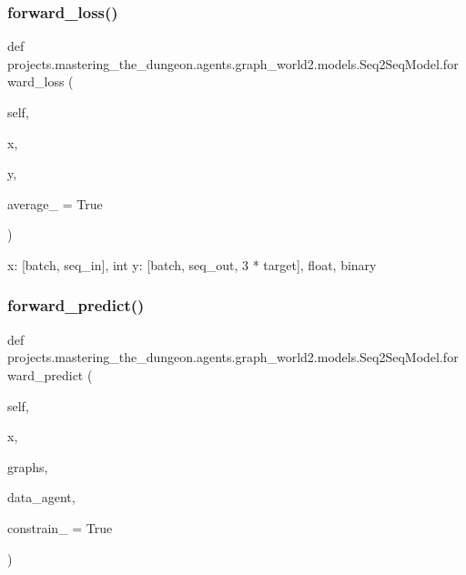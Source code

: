 \subsubsection{\texorpdfstring{forward\+\_\+loss()}{forward\_loss()}}
{\footnotesize\ttfamily def projects.\+mastering\+\_\+the\+\_\+dungeon.\+agents.\+graph\+\_\+world2.\+models.\+Seq2\+Seq\+Model.\+forward\+\_\+loss (\begin{DoxyParamCaption}\item[{}]{self,  }\item[{}]{x,  }\item[{}]{y,  }\item[{}]{average\+\_\+ = {\ttfamily True} }\end{DoxyParamCaption})}

\begin{DoxyVerb}x: [batch, seq_in], int
y: [batch, seq_out, 3 * target], float, binary
\end{DoxyVerb}
 \mbox{\label{classprojects_1_1mastering__the__dungeon_1_1agents_1_1graph__world2_1_1models_1_1Seq2SeqModel_af7293dc5efe834b8f176a5dd2cb7b770}} 
\subsubsection{\texorpdfstring{forward\+\_\+predict()}{forward\_predict()}}
{\footnotesize\ttfamily def projects.\+mastering\+\_\+the\+\_\+dungeon.\+agents.\+graph\+\_\+world2.\+models.\+Seq2\+Seq\+Model.\+forward\+\_\+predict (\begin{DoxyParamCaption}\item[{}]{self,  }\item[{}]{x,  }\item[{}]{graphs,  }\item[{}]{data\+\_\+agent,  }\item[{}]{constrain\+\_\+ = {\ttfamily True} }\end{DoxyParamCaption})}



